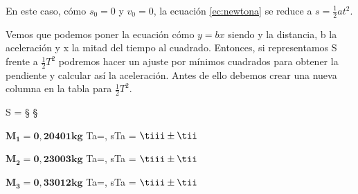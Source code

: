 \documentclass[12pt, a4paper, titlepage]{article}
\begin{document}
  En este caso, cómo $s_0 = 0$ y $v_0 = 0$, la ecuación \ref{ec:newtona} se reduce a $s = \frac{1}{2}at^2$.

  Vemos que podemos poner la ecuación cómo $y = bx$ siendo y la distancia, b la aceleración y x la mitad del tiempo al cuadrado. Entonces, si representamos S frente a $\frac{1}{2}T^2$ podremos hacer un ajuste por mínimos cuadrados para obtener la pendiente y calcular así la aceleración. Antes de ello debemos crear una nueva columna en la tabla para $\frac{1}{2}T^2$.

  \begin{center}
    \vspace{0.6cm}
    \begin{minipage}[H]{0.12\textwidth}
      \centering
      \vspace{0.40cm}
        {S = \S}
        {\S}
    \end{minipage}
    \begin{minipage}[H]{0.27\textwidth}
      \centering
      $\mathbf{M_1 = 0,20401kg}$
        {Ta=\tiii, sTa = \tii}
        {$\tiii \pm \tii$}
    \end{minipage}
    \begin{minipage}[H]{0.27\textwidth}
      \centering
      $\mathbf{M_2 = 0,23003kg}$
        {Ta=\tiii, sTa = \tii}
        {$\tiii \pm \tii$}
    \end{minipage}
    \begin{minipage}[H]{0.27\textwidth}
      \centering
      $\mathbf{M_3 = 0,33012kg}$
        {Ta=\tiii, sTa = \tii}
        {$\tiii \pm \tii$}
    \end{minipage}
    \vspace{0.6cm}
  \end{center}
\end{document}
